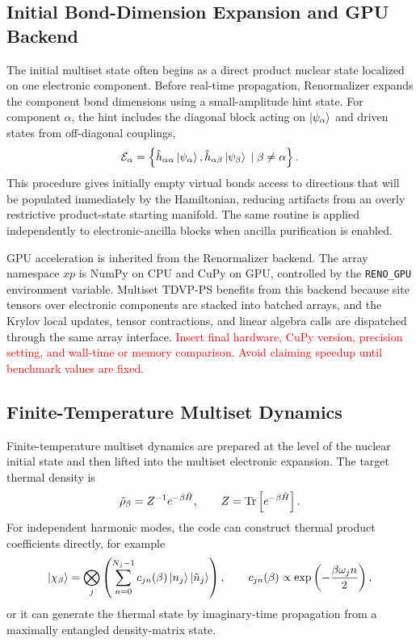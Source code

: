 \documentclass[journal=jctcce,manuscript=article]{achemso}
\newcommand{\placeholder}[1]{\textcolor{red}{#1}}
\begin{document}
\subsection{Initial Bond-Dimension Expansion and GPU Backend}

The initial multiset state often begins as a direct product nuclear state localized on one electronic component. Before real-time propagation, Renormalizer expands the component bond dimensions using a small-amplitude hint state. For component \(\alpha\), the hint includes the diagonal block acting on \(\ket{\psi_{\alpha}}\) and driven states from off-diagonal couplings,
\begin{equation}
    \mathcal E_{\alpha}=\left\{\hat h_{\alpha\alpha}\ket{\psi_{\alpha}},
    \hat h_{\alpha\beta}\ket{\psi_{\beta}}\;|\;\beta\ne\alpha\right\}.
    \label{eq:bond-expansion-hint}
\end{equation}
This procedure gives initially empty virtual bonds access to directions that will be populated immediately by the Hamiltonian, reducing artifacts from an overly restrictive product-state starting manifold. The same routine is applied independently to electronic-ancilla blocks when ancilla purification is enabled.

GPU acceleration is inherited from the Renormalizer backend. The array namespace \(xp\) is NumPy on CPU and CuPy on GPU, controlled by the \texttt{RENO\_GPU} environment variable. Multiset TDVP-PS benefits from this backend because site tensors over electronic components are stacked into batched arrays, and the Krylov local updates, tensor contractions, and linear algebra calls are dispatched through the same array interface. \placeholder{Insert final hardware, CuPy version, precision setting, and wall-time or memory comparison. Avoid claiming speedup until benchmark values are fixed.}

\subsection{Finite-Temperature Multiset Dynamics}

Finite-temperature multiset dynamics are prepared at the level of the nuclear initial state and then lifted into the multiset electronic expansion. The target thermal density is
\begin{equation}
    \hat\rho_{\beta}=Z^{-1}e^{-\beta\hat H},
    \qquad Z=\Tr\left[e^{-\beta\hat H}\right].
    \label{eq:thermal-density}
\end{equation}
For independent harmonic modes, the code can construct thermal product coefficients directly, for example
\begin{equation}
    \ket{\chi_{\beta}}=\bigotimes_j
    \left(\sum_{n=0}^{N_j-1} c_{jn}(\beta)\ket{n_j}\ket{\tilde n_j}\right),
    \qquad
    c_{jn}(\beta)\propto \exp\left(-\frac{\beta\omega_j n}{2}\right),
    \label{eq:thermal-product}
\end{equation}
or it can generate the thermal state by imaginary-time propagation from a maximally entangled density-matrix state.
\end{document}
